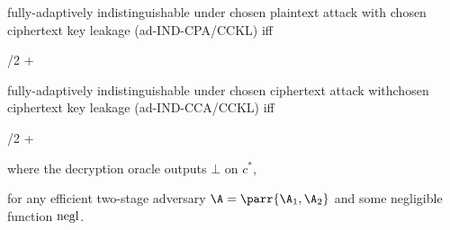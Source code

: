 \begin{definition}
\begin{sitemize}
        \item fully-adaptively indistinguishable under chosen plaintext attack with chosen ciphertext key leakage (ad-IND-CPA/CCKL) iff
        \begin{bralign}
            /2 + \varepsilon\parr{\secpar}
        \end{bralign}

        \item fully-adaptively indistinguishable under chosen ciphertext attack withchosen ciphertext key leakage (ad-IND-CCA/CCKL) iff
        \begin{bralign}
            /2 + \varepsilon\parr{\secpar}
        \end{bralign}
        where the decryption oracle outputs \(\bot\) on \(c^*\),
    \end{sitemize}
    for any efficient two-stage adversary \(\A = \parr{\A_1, \A_2}\) and some negligible function \(\operatorname{negl}\).
\end{definition}